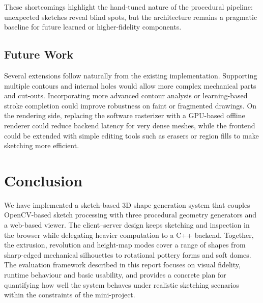 \documentclass[11pt, a4paper]{article}
\begin{document}
These shortcomings highlight the hand-tuned nature of the procedural pipeline: unexpected sketches reveal blind spots, but the architecture remains a pragmatic baseline for future learned or higher-fidelity components.

\subsection{Future Work}
Several extensions follow naturally from the existing implementation. Supporting multiple contours and internal holes would allow more complex mechanical parts and cut-outs. Incorporating more advanced contour analysis or learning-based stroke completion could improve robustness on faint or fragmented drawings. On the rendering side, replacing the software rasterizer with a GPU-based offline renderer could reduce backend latency for very dense meshes, while the frontend could be extended with simple editing tools such as erasers or region fills to make sketching more efficient.

\section{Conclusion}
We have implemented a sketch-based 3D shape generation system that couples OpenCV-based sketch processing with three procedural geometry generators and a web-based viewer. The client--server design keeps sketching and inspection in the browser while delegating heavier computation to a C++ backend. Together, the extrusion, revolution and height-map modes cover a range of shapes from sharp-edged mechanical silhouettes to rotational pottery forms and soft domes. The evaluation framework described in this report focuses on visual fidelity, runtime behaviour and basic usability, and provides a concrete plan for quantifying how well the system behaves under realistic sketching scenarios within the constraints of the mini-project.



\end{document}
